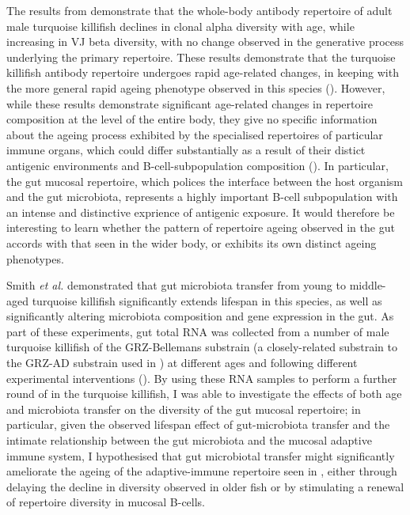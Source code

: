 The results from  demonstrate that the whole-body antibody repertoire of adult male turquoise killifish declines in clonal alpha diversity with age, while increasing in VJ beta diversity, with no change observed in the generative process underlying the primary repertoire. These results demonstrate that the turquoise killifish antibody repertoire undergoes rapid age-related changes, in keeping with the more general rapid ageing phenotype observed in this species (). However, while these results demonstrate significant age-related changes in repertoire composition at the level of the entire body, they give no specific information about the ageing process exhibited by the specialised repertoires of particular immune organs, which could differ substantially as a result of their distict antigenic environments and B-cell-subpopulation composition (). In particular, the gut mucosal repertoire, which polices the interface between the host organism and the gut microbiota, represents a highly important B-cell subpopulation with an intense and distinctive exprience of antigenic exposure. It would therefore be interesting to learn whether the pattern of repertoire ageing observed in the gut accords with that seen in the wider body, or exhibits its own distinct ageing phenotypes.

Smith \textit{et al.} \parencite{smith2017microbiota} demonstrated that gut microbiota transfer from young to middle-aged turquoise killifish significantly extends lifespan in this species, as well as significantly altering microbiota composition and gene expression in the gut. As part of these experiments, gut total RNA was collected from a number of male turquoise killifish of the GRZ-Bellemans substrain (a closely-related substrain to the GRZ-AD substrain used in ) at different ages and following different experimental interventions (). By using these RNA samples to perform a further round of \Igseq in the turquoise killifish, I was able to investigate the effects of both age and microbiota transfer on the diversity of the gut mucosal repertoire; in particular, given the observed lifespan effect of gut-microbiota transfer and the intimate relationship between the gut microbiota and the mucosal adaptive immune system, I hypothesised that gut microbiotal transfer might significantly ameliorate the ageing of the adaptive-immune repertoire seen in , either through delaying the decline in diversity observed in older fish or by stimulating a renewal of repertoire diversity in mucosal B-cells.

